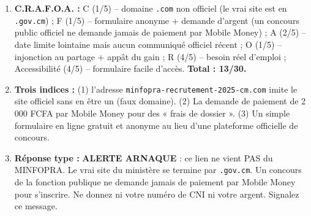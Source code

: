 \documentclass[11pt]{article}
\begin{document}
\begin{corrige}
\begin{enumerate}
    \item \textbf{C.R.A.F.O.A. :} C (1/5) -- domaine \texttt{.com} non officiel (le vrai site est en \texttt{.gov.cm}) ; F (1/5) -- formulaire anonyme + demande d'argent (un concours public officiel ne demande jamais de paiement par Mobile Money) ; A (2/5) -- date limite lointaine mais aucun communiqué officiel récent ; O (1/5) -- injonction au partage + appât du gain ; R (4/5) -- besoin réel d'emploi ; Accessibilité (4/5) -- formulaire facile d'accès. \textbf{Total : 13/30.}
    \item \textbf{Trois indices :} (1) l'adresse \texttt{minfopra-recrutement-2025-cm.com} imite le site officiel sans en être un (faux domaine). (2) La demande de paiement de 2 000 FCFA par Mobile Money pour des « frais de dossier ». (3) Un simple formulaire en ligne gratuit et anonyme au lieu d'une plateforme officielle de concours.
    \item \textbf{Réponse type :} \og{} \textbf{ALERTE ARNAQUE} : ce lien ne vient PAS du MINFOPRA. Le vrai site du ministère se termine par \texttt{.gov.cm}. Un concours de la fonction publique ne demande jamais de paiement par Mobile Money pour s'inscrire. Ne donnez ni votre numéro de CNI ni votre argent. Signalez ce message. \fg{}
\end{enumerate}
\end{corrige}
\end{document}

